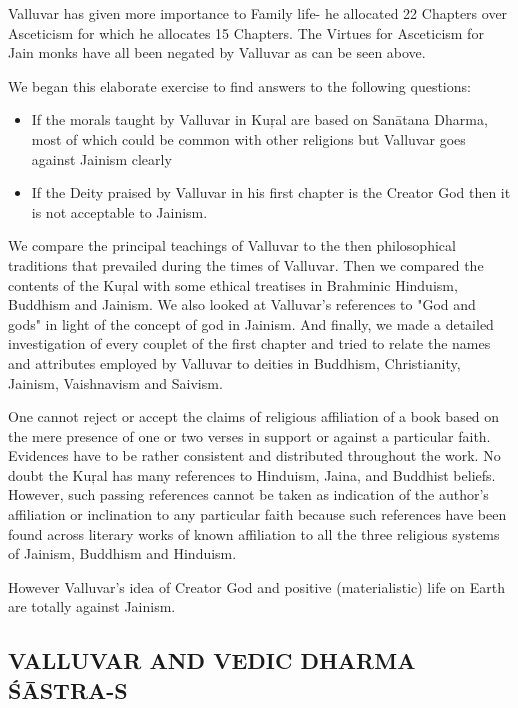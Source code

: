 Valluvar has given more importance to Family life- he allocated 22 Chapters over Asceticism for which he allocates 15 Chapters. The Virtues for Asceticism for Jain monks have all been negated by Valluvar as can be seen above.

We began this elaborate exercise to find answers to the following questions:

\begin{itemize}
\item If the morals taught by Valluvar in Kuŗal are based on Sanātana Dharma, most of which could be common with other religions but Valluvar goes against Jainism clearly

 \item If the Deity praised by Valluvar in his first chapter is the Creator God then it is not acceptable to Jainism.

\end{itemize}

We compare the principal teachings of Valluvar to the then philosophical traditions that prevailed during the times of Valluvar. Then we compared the contents of the Kuŗal with some ethical treatises in Brahminic Hinduism, Buddhism and Jainism. We also looked at Valluvar's references to "God and gods" in light of the concept of god in Jainism. And finally, we made a detailed investigation of every couplet of the first chapter and tried to relate the names and attributes employed by Valluvar to deities in Buddhism, Christianity, Jainism, Vaishnavism and Saivism.

One cannot reject or accept the claims of religious affiliation of a book based on the mere presence of one or two verses in support or against a particular faith. Evidences have to be rather consistent and distributed throughout the work. No doubt the Kuŗal has many references to Hinduism, Jaina, and Buddhist beliefs. However, such passing references cannot be taken as indication of the author's affiliation or inclination to any particular faith because such references have been found across literary works of known affiliation to all the three religious systems of Jainism, Buddhism and Hinduism.

However Valluvar’s idea of Creator God and positive (materialistic) life on Earth are totally against Jainism.

\subsection*{VALLUVAR AND VEDIC DHARMA ŚĀSTRA-S}

